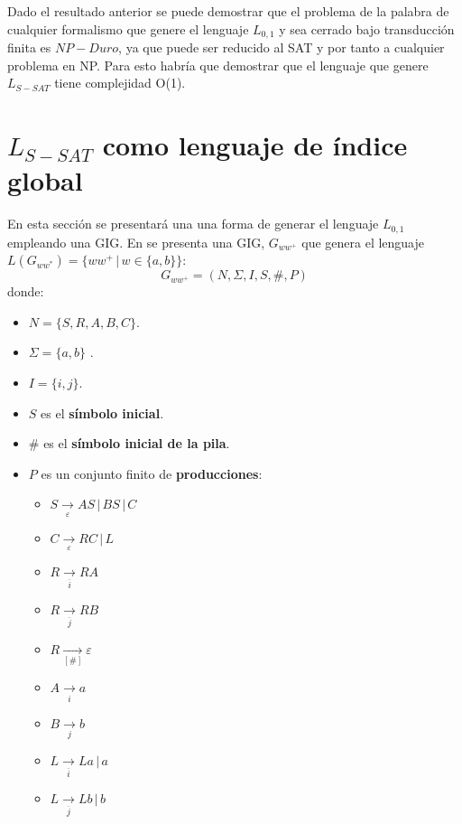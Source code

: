 \documentclass[12pt]{article}
\begin{document}
Dado el resultado anterior se puede demostrar que el problema de la palabra de cualquier formalismo que genere el lenguaje 
$L_{0,1}$ y sea cerrado bajo transducción finita es $NP-Duro$, ya que puede ser reducido al SAT y por tanto a cualquier problema
en NP. Para esto habría que demostrar que el lenguaje que genere $L_{S-SAT}$ tiene complejidad O(1).


\section{$L_{S-SAT}$ como lenguaje de índice global}

En esta sección se presentará una una forma de generar el lenguaje $L_{0,1}$ empleando una GIG. En \cite{globalIndexLanguages} se presenta
una GIG, $G_{ww^+}$ que genera el lenguaje $L(G_{ww^*})=\{ww^+\,|\,w\in\{a,b\}\}$: 
$$
    G_{ww^+} = (N, \Sigma, I, S, \#, P) 
$$
donde:

\begin{itemize}
    \item $N= \{S,R,A,B,C\}$.
    \item \( \Sigma=\{a,b\} \) .
    \item $I=\{i,j\}$.
    \item $S$ es el \textbf{símbolo inicial}.
    \item $\#$ es el \textbf{símbolo inicial de la pila}.
    \item $P$ es un conjunto finito de \textbf{producciones}:
          \begin{multicols}{2}
              \begin{itemize}
                  \item $S\underset{\varepsilon}{\to} AS\,|\,BS\,|\,C$
                  \item $C\underset{\varepsilon}{\to} RC\,|\,L$
                  \item $R\underset{\overline{i}}{\to} RA$
                  \item $R\underset{\overline{j}}{\to} RB$
                  \item $R\underset{[\#]}{\to} \varepsilon$
                  \item $A\underset{i}{\to} a$
                  \item $B\underset{j}{\to} b$
                  \item $L\underset{\overline{i}}{\to} La\,|\,a$
                  \item $L\underset{\overline{j}}{\to} Lb\,|\,b$
              \end{itemize}
          \end{multicols}
\end{itemize}
\end{document}
